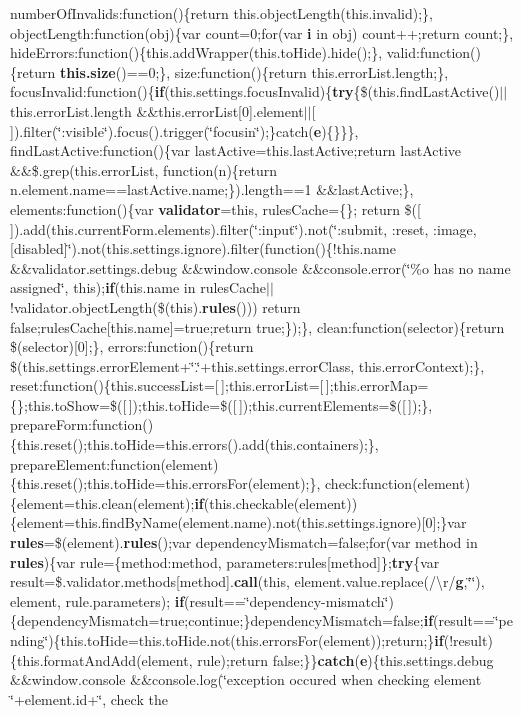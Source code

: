 {\begin{DoxyParamCaption}
number\+Of\+Invalids\+:function()\{return this.\+object\+Length(this.\+invalid);\}, object\+Length\+:function(obj)\{var count=0;for(var {\bf i} in obj) count++;return count;\}, hide\+Errors\+:function()\{this.\+add\+Wrapper(this.\+to\+Hide).hide();\}, valid\+:function()\{return {\bf this.\+size}()==0;\}, size\+:function()\{return this.\+error\+List.\+length;\}, focus\+Invalid\+:function()\{{\bf if}(this.\+settings.\+focus\+Invalid)\{{\bf try}\{\$(this.\+find\+Last\+Active()$\vert$$\vert$this.\+error\+List.\+length \&\&this.\+error\+List\mbox{[}0\mbox{]}.element$\vert$$\vert$\mbox{[}$\,$\mbox{]}).filter(\char`\"{}\+:visible\char`\"{}).focus().trigger(\char`\"{}focusin\char`\"{});\}catch({\bf e})\{\}\}\}, find\+Last\+Active\+:function()\{var last\+Active=this.\+last\+Active;return last\+Active \&\&\$.grep(this.\+error\+List, function(n)\{return n.\+element.\+name==last\+Active.\+name;\}).length==1 \&\&last\+Active;\}, elements\+:function()\{var {\bf validator}=this, rules\+Cache=\{\};   return \$(\mbox{[}$\,$\mbox{]}).add(this.\+current\+Form.\+elements).filter(\char`\"{}\+:input\char`\"{}).not(\char`\"{}\+:submit, \+:reset, \+:image, \mbox{[}disabled\mbox{]}\char`\"{}).not(this.\+settings.\+ignore).filter(function()\{!this.\+name \&\&validator.\+settings.\+debug \&\&window.\+console \&\&console.\+error(\char`\"{}\%o has no name assigned\char`\"{}, this);{\bf if}(this.\+name in rules\+Cache$\vert$$\vert$!validator.\+object\+Length(\$(this).{\bf rules}())) return false;rules\+Cache\mbox{[}this.\+name\mbox{]}=true;return true;\});\}, clean\+:function(selector)\{return \$(selector)\mbox{[}0\mbox{]};\}, errors\+:function()\{return \$(this.\+settings.\+error\+Element+\char`\"{}.\char`\"{}+this.\+settings.\+error\+Class, this.\+error\+Context);\}, reset\+:function()\{this.\+success\+List=\mbox{[}$\,$\mbox{]};this.\+error\+List=\mbox{[}$\,$\mbox{]};this.\+error\+Map=\{\};this.\+to\+Show=\$(\mbox{[}$\,$\mbox{]});this.\+to\+Hide=\$(\mbox{[}$\,$\mbox{]});this.\+current\+Elements=\$(\mbox{[}$\,$\mbox{]});\}, prepare\+Form\+:function()\{this.\+reset();this.\+to\+Hide=this.\+errors().add(this.\+containers);\}, prepare\+Element\+:function(element)\{this.\+reset();this.\+to\+Hide=this.\+errors\+For(element);\}, check\+:function(element)\{element=this.\+clean(element);{\bf if}(this.\+checkable(element))\{element=this.\+find\+By\+Name(element.\+name).not(this.\+settings.\+ignore)\mbox{[}0\mbox{]};\}var {\bf rules}=\$(element).{\bf rules}();var dependency\+Mismatch=false;for(var method in {\bf rules})\{var rule=\{method\+:method, parameters\+:rules\mbox{[}method\mbox{]}\};{\bf try}\{var result=\$.validator.\+methods\mbox{[}method\mbox{]}.{\bf call}(this, element.\+value.\+replace(/\textbackslash{}r/{\bf g},\char`\"{}\char`\"{}), element, rule.\+parameters);   {\bf if}(result==\char`\"{}dependency-\/mismatch\char`\"{})\{dependency\+Mismatch=true;continue;\}dependency\+Mismatch=false;{\bf if}(result==\char`\"{}pending\char`\"{})\{this.\+to\+Hide=this.\+to\+Hide.\+not(this.\+errors\+For(element));return;\}{\bf if}(!result)\{this.\+format\+And\+Add(element, rule);return false;\}\}{\bf catch}({\bf e})\{this.\+settings.\+debug \&\&window.\+console \&\&console.\+log(\char`\"{}exception occured when checking element \char`\"{}+element.\+id+\char`\"{}, check the 
\end{DoxyParamCaption}}
